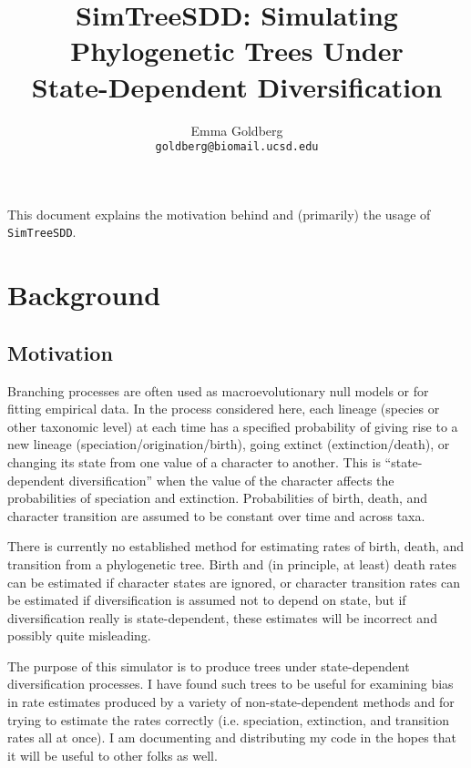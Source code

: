\documentclass[10pt]{article}
\begin{document}
\title{ \Large{ {\bf SimTreeSDD}: {\bf Sim}ulating Phylogenetic {\bf Tree}s Under \\ {\bf S}tate-{\bf D}ependent {\bf D}iversification } }
\author{ \large{Emma Goldberg} \\ \normalsize{\texttt{goldberg@biomail.ucsd.edu}} }
\maketitle

This document explains the motivation behind and (primarily) the usage of {\tt SimTreeSDD}.

\tableofcontents

\section*{Background}

\subsection*{Motivation}

Branching processes are often used as macroevolutionary null models or for fitting empirical data.  In the process considered here, each lineage (species or other taxonomic level) at each time has a specified probability of giving rise to a new lineage (speciation/origination/birth), going extinct (extinction/death), or changing its state from one value of a character to another.  This is ``state-dependent diversification'' when the value of the character affects the probabilities of speciation and extinction.  Probabilities of birth, death, and character transition are assumed to be constant over time and across taxa.

There is currently no established method for estimating rates of birth, death, and transition from a phylogenetic tree.  Birth and (in principle, at least) death rates can be estimated if character states are ignored, or character transition rates can be estimated if diversification is assumed not to depend on state, but if diversification really is state-dependent, these estimates will be incorrect and possibly quite misleading.

The purpose of this simulator is to produce trees under state-dependent diversification processes.  I have found such trees to be useful for examining bias in rate estimates produced by a variety of non-state-dependent methods and for trying to estimate the rates correctly (i.e. speciation, extinction, and transition rates all at once).  I am documenting and distributing my code in the hopes that it will be useful to other folks as well.
\end{document}
